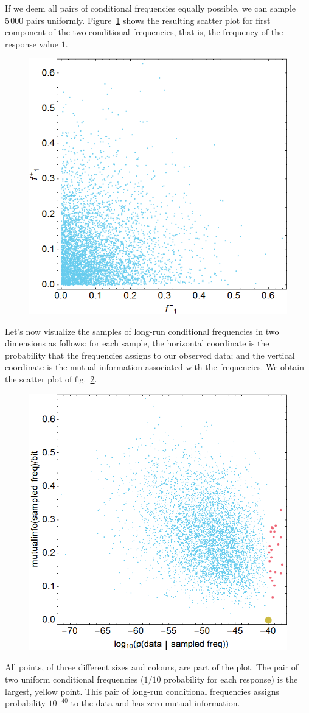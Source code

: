 \documentclass[\ifafour a4paper,12pt,\else a5paper,10pt,\fi%
onecolumn,oneside,article,%
british%
]{memoir}
\theoremstyle{remark}
\theoremstyle{innote}
\renewcommand*{\|}{\nonscript\,\vert\nonscript\;\mathopen{}}
\newcommand*{\fig}{fig.}%
\begin{document}
If we deem all pairs of conditional frequencies equally possible, we can
sample $5\,000$ pairs uniformly. Figure~\ref{fig:f1_unif} shows the
resulting scatter plot for first component of the two conditional
frequencies, that is, the frequency of the response value $1$.
\begin{figure}[h!]
\centering\includegraphics[width=0.5\linewidth]{A_sample_f1.png}\\
\caption{}\label{fig:f1_unif}
\end{figure}%

Let's now visualize the samples of long-run conditional frequencies in two
dimensions as follows: for each sample, the horizontal coordinate is the
probability that the frequencies assigns to our observed data; and the
vertical coordinate is the mutual information associated with the
frequencies. We obtain the scatter plot of
\fig~\ref{fig:init_scatter_unif}.
\begin{figure}[h!]
\centering\includegraphics[width=0.75\linewidth]{A_init_scatter.png}\\
\caption{}\label{fig:init_scatter_unif}
\end{figure}%
All points, of three different sizes and colours, are part of the plot. The
pair of two uniform conditional frequencies ($1/10$ probability for each
response) is the largest, yellow point. This pair of long-run conditional
frequencies assigns probability $10^{-40}$ to the data and has zero mutual
information.
\end{document}
